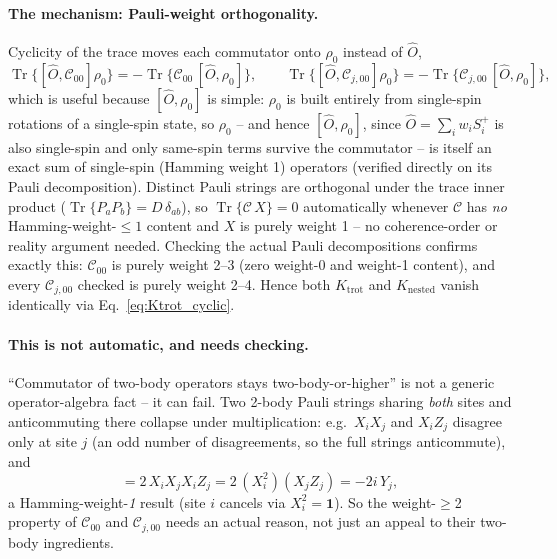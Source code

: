 \documentclass[11pt]{article}
\newcommand{\calC}{\mathcal{C}}
\DeclareMathOperator{\Tr}{Tr}
\begin{document}
\paragraph{The mechanism: Pauli-weight orthogonality.} Cyclicity of the trace moves each commutator onto $\rho_0$ instead of $\hat{O}$,
\begin{equation}\label{eq:Ktrot_cyclic}
    \Tr\{[\hat{O},\calC_{00}]\rho_0\} = -\Tr\{\calC_{00}\,[\hat{O},\rho_0]\},\qquad
    \Tr\{[\hat{O},\calC_{j,00}]\rho_0\} = -\Tr\{\calC_{j,00}\,[\hat{O},\rho_0]\},
\end{equation}
which is useful because $[\hat{O},\rho_0]$ is simple: $\rho_0$ is built entirely from single-spin rotations of a single-spin state, so $\rho_0$ -- and hence $[\hat{O},\rho_0]$, since $\hat{O}=\sum_iw_iS_i^+$ is also single-spin and only same-spin terms survive the commutator -- is itself an exact sum of single-spin (Hamming weight 1) operators (verified directly on its Pauli decomposition). Distinct Pauli strings are orthogonal under the trace inner product ($\Tr\{P_aP_b\}=D\,\delta_{ab}$), so $\Tr\{\calC\,X\}=0$ automatically whenever $\calC$ has \emph{no} Hamming-weight-$\le\!1$ content and $X$ is purely weight 1 -- no coherence-order or reality argument needed. Checking the actual Pauli decompositions confirms exactly this: $\calC_{00}$ is purely weight 2--3 (zero weight-0 and weight-1 content), and every $\calC_{j,00}$ checked is purely weight 2--4. Hence both $K_{\text{trot}}$ and $K_{\text{nested}}$ vanish identically via Eq.~\eqref{eq:Ktrot_cyclic}.

\paragraph{This is not automatic, and needs checking.} ``Commutator of two-body operators stays two-body-or-higher'' is not a generic operator-algebra fact -- it can fail. Two 2-body Pauli strings sharing \emph{both} sites and anticommuting there collapse under multiplication: e.g.\ $X_iX_j$ and $X_iZ_j$ disagree only at site $j$ (an odd number of disagreements, so the full strings anticommute), and
\begin{equation}
    [X_iX_j,\,X_iZ_j] = 2\,X_iX_jX_iZ_j = 2\,(X_i^2)(X_jZ_j) = -2i\,Y_j,
\end{equation}
a Hamming-weight-\emph{1} result (site $i$ cancels via $X_i^2=\mathbf{1}$). So the weight-$\ge$2 property of $\calC_{00}$ and $\calC_{j,00}$ needs an actual reason, not just an appeal to their two-body ingredients.
\end{document}
